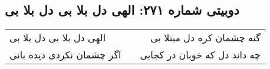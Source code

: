 \begin{center}
\section*{دوبیتی شماره ۲۷۱: الهی دل بلا بی دل بلا بی}
\label{sec:271}
\begin{longtable}{l p{0.5cm} r}
الهی دل بلا بی دل بلا بی
&&
گنه چشمان کره دل مبتلا بی
\\
اگر چشمان نکردی دیده بانی
&&
چه داند دل که خوبان در کجابی
\\
\end{longtable}
\end{center}
